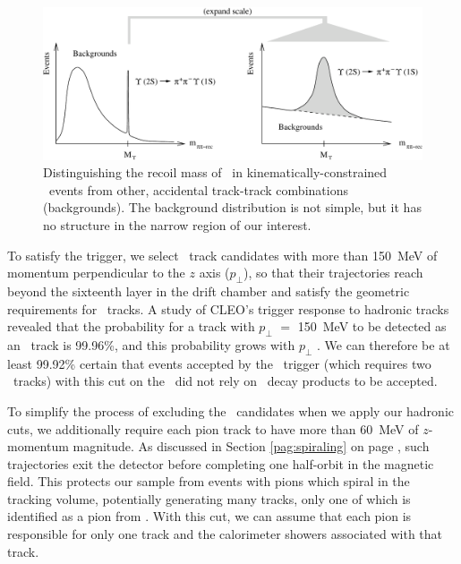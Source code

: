 \documentclass{cornell}
\begin{document}
\begin{figure}[t]
  \begin{center}
    \includegraphics[width=\linewidth]{plots/cascadescartoon}
  \end{center}
  \caption[Identifying \twotoone\ events by \pipi\ recoil
  mass]{\label{cascadescartoon} Distinguishing the recoil mass of
  \pipi\ in kinematically-constrained \twotoone\ events from other,
  accidental track-track combinations (backgrounds).  The background
  distribution is not simple, but it has no structure in the narrow
  region of our interest.}
\end{figure}

To satisfy the trigger, we select \pipi\ track candidates with more
than 150~MeV of momentum perpendicular to the $z$ axis ($p_\perp$), so
that their trajectories reach beyond the sixteenth layer in the drift
chamber and satisfy the geometric requirements for \axial\ tracks.  A
study of CLEO's trigger response to hadronic tracks revealed that the
probability for a track with $p_\perp$ $=$ 150~MeV to be detected as
an \axial\ track is 99.96\%, and this probability grows with $p_\perp$
\cite{inga}.  We can therefore be at least 99.92\% certain that events
accepted by the \twotrack\ trigger (which requires two \axial\ tracks)
with this cut on the \pipi\ did not rely on \us\ decay products to be
accepted.

To simplify the process of excluding the \pipi\ candidates when we
apply our hadronic cuts, we additionally require each pion track to
have more than 60~MeV of $z$-momentum magnitude.  As discussed in
Section \ref{pag:spiraling} on page \pageref{pag:spiraling}, such
trajectories exit the detector before completing one half-orbit in the
magnetic field.  This protects our sample from events with pions which
spiral in the tracking volume, potentially generating many tracks,
only one of which is identified as a pion from \twotoone.  With this
cut, we can assume that each pion is responsible for only one track
and the calorimeter showers associated with that track.
\end{document}
